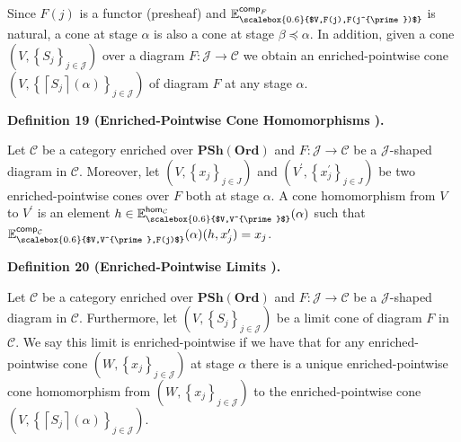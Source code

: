 \documentclass[10pt,a4paper]{article}
\begin{document}
 
 
 
Since $F(j)$ is a functor (presheaf) and $\mathbb{E}^{\mathsf{comp}_{F}}_{\scalebox{0.6}{$V,F(j),F(j^{\prime})$}}$ is natural, a cone at stage $\alpha$ is also a cone at stage $\beta\preceq\alpha$. In addition, given a cone $(V,\left\{S_{j}\right\}_{j\in\mathcal{J}})$ over a diagram $F:\mathcal{J}\to\mathcal{C}$ we obtain an enriched-pointwise cone $(V,\left\{\left\lceil{S_{j}}\right\rceil(\alpha)\right\}_{j\in\mathcal{J}})$ of diagram $F$ at any stage $\alpha$.\par
 
 
 
\par\medskip\noindent\textbf{Definition 19 (Enriched-Pointwise Cone Homomorphisms ).}\par
 
 
Let $\mathcal{C}$ be a category enriched over $\mathbf{PSh}(\mathbf{Ord})$ and $F:\mathcal{J}\to\mathcal{C}$ be a $\mathcal{J}$-shaped diagram in $\mathcal{C}$. Moreover, let $(V,\left\{x_{j}\right\}_{j\in J})$ and $(V^{\prime},\left\{x^{\prime}_{j}\right\}_{j\in J})$ be two enriched-pointwise cones over $F$ both at stage $\alpha$. A cone homomorphism from $V$ to $V^{\prime}$ is an element $h\in\mathbb{E}^{\mathsf{hom}_{\mathcal{C}}}_{\scalebox{0.6}{$V,V^{\prime}$}}(\alpha)$ such that $\mathbb{E}^{\mathsf{comp}_{\mathcal{C}}}_{\scalebox{0.6}{$V,V^{\prime},F(j)$}}(\alpha)(h,x^{\prime}_{j})=x_{j}$.\par
 
 
 
 
\par\medskip\noindent\textbf{Definition 20 (Enriched-Pointwise Limits ).}\par
 
 
Let $\mathcal{C}$ be a category enriched over $\mathbf{PSh}(\mathbf{Ord})$ and $F:\mathcal{J}\to\mathcal{C}$ be a $\mathcal{J}$-shaped diagram in $\mathcal{C}$. Furthermore, let $(V,\left\{S_{j}\right\}_{j\in\mathcal{J}})$ be a limit cone of diagram $F$ in $\mathcal{C}$. We say this limit is enriched-pointwise if we have that for any enriched-pointwise cone $(W,\left\{x_{j}\right\}_{j\in\mathcal{J}})$ at stage $\alpha$ there is a unique enriched-pointwise cone homomorphism from $(W,\left\{x_{j}\right\}_{j\in\mathcal{J}})$ to the enriched-pointwise cone $(V,\left\{\left\lceil{S_{j}}\right\rceil(\alpha)\right\}_{j\in\mathcal{J}})$.\par
 
\end{document}

